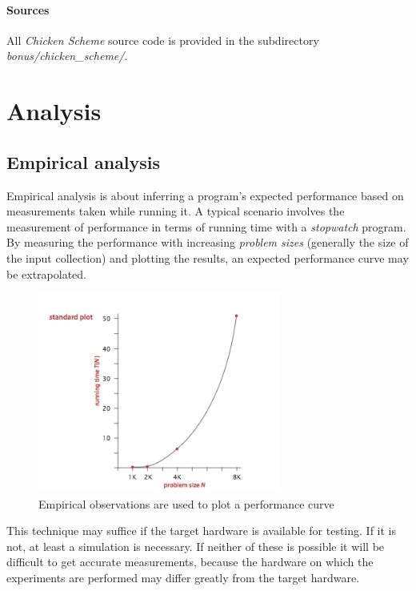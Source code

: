 \documentclass{article}
\begin{document}
\paragraph{Sources}
All {\em Chicken Scheme} source code is provided in the subdirectory {\em bonus/chicken\_scheme/}.


\newpage


\section{Analysis}

\subsection{Empirical analysis}
Empirical analysis is about inferring a program's expected performance based on measurements taken while running it. A typical
scenario involves the measurement of performance in terms of running time with a {\em stopwatch} program. By measuring the
performance with increasing {\em problem sizes} (generally the size of the input collection\cite[p.25]{introduction-to-algorithms})
and plotting the results, an expected performance curve may be extrapolated.

\begin{figure}[H]
  \centering
  \includegraphics[width=8cm]{empirical_measurement}
  \caption{Empirical observations are used to plot a performance curve\cite[p.17]{empirical-analysis-princeton}}
\end{figure}

This technique may suffice if the target hardware is available for testing. If it is not, at least a simulation is necessary.
If neither of these is possible it will be difficult to get accurate measurements, because the hardware on which the experiments
are performed may differ greatly from the target hardware\cite[p.22]{empirical-analysis-princeton}.
\end{document}
